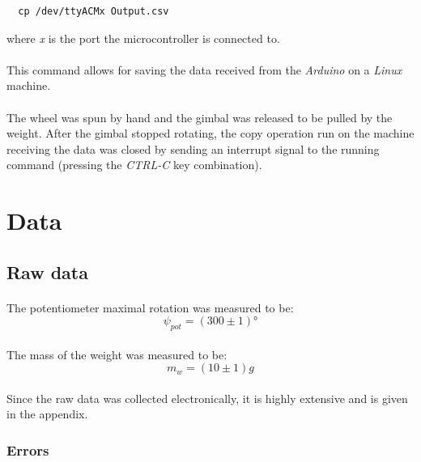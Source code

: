 \documentclass[a4paper]{article}
\begin{document}
\begin{lstlisting}
  cp /dev/ttyACMx Output.csv
\end{lstlisting}
where \textit{x} is the port the microcontroller is connected to.

\paragraph*{}
This command allows for saving the data received from the \textit{Arduino} on a
\textit{Linux} machine.

\paragraph*{}
The wheel was spun by hand and the gimbal was released to be pulled by the
weight. After the gimbal stopped rotating, the copy operation run on the
machine receiving the data was closed by sending an interrupt signal to the
running command (pressing the \textit{CTRL-C} key combination).

\section{Data}

\subsection{Raw data}

\paragraph*{}
The potentiometer maximal rotation was measured to be:
$$\psi_{pot} = (300 \pm 1) \si{\degree} $$

\paragraph*{}
The mass of the weight was measured to be:
$$m_w = (10 \pm 1) \si{g}$$

\paragraph*{}
Since the raw data was collected electronically, it is highly extensive and is
given in the appendix.

\subsubsection{Errors}
\end{document}
